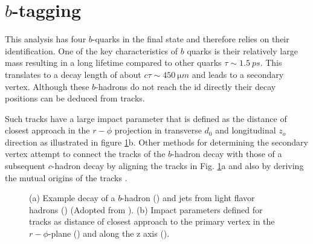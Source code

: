 \section{$b$-tagging}\label{sec:b_tagging}
This analysis has four $b$-quarks in the final state and therefore relies on their identification. One of the key characteristics of $b$ quarks is their relatively large mass resulting in a long lifetime compared to other quarks $\tau\sim\qty{1.5}{ps}$. This translates to a decay length of about $c\tau \sim \qty{450}{\micro m}$ and leads to a secondary vertex. Although these $b$-hadrons do not reach the \ac{id} directly their decay positions can be deduced from tracks.

Such tracks have a large impact parameter that is defined as the distance of closest approach in the $r-\phi$ projection in transverse $d_0$ and longitudinal $z_o$ direction \citep{aad2008atlas} as illustrated in figure \ref{fig:secondary_vertex}b. Other methods for determining the secondary vertex attempt to connect the tracks of the $b$-hadron decay with those of a subsequent $c$-hadron decay by aligning the tracks in Fig. \ref{fig:secondary_vertex}a and also by deriving the mutual origins of the tracks \citep{ATL-PHYS-PUB-2017-013}.
\begin{figure}[]
  \centering
  \caption{(a) Example decay of a $b$-hadron () and jets from light flavor hadrons () (Adopted from \cite{Guth:2765038}). (b) Impact parameters defined for tracks as distance of closest approach to the primary vertex in the $r-\phi$-plane (\mbox{\color[HTML]{009245}{$d_0$}}) and along the z axis (\mbox{\color[HTML]{EC1C25}{$z_0$}}).}
  \label{fig:secondary_vertex}
\end{figure}

